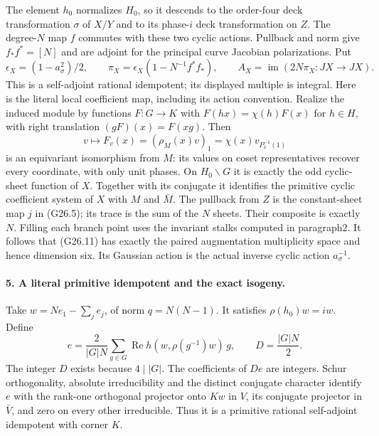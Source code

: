 The element \(h_0\) normalizes \(H_0\), so it descends
to the order-four deck transformation \(\sigma\) of \(X/Y\)
and to its phase-\(i\) deck transformation on \(Z\).
The degree-\(N\) map \(f\) commutes with these two cyclic
actions. Pullback and norm give \(f_*f^*=[N]\) and are
adjoint for the principal curve Jacobian polarizations.
Put
\[
 \epsilon_X=(1-a_\sigma^2)/2,\qquad
 \pi_X=\epsilon_X(1-N^{-1}f^*f_*),\qquad
 A_X=\operatorname{im}(2N\pi_X:JX\to JX).
                                                               \tag{G26.11}
\]
This is a self-adjoint rational idempotent; its displayed
multiple is integral. Here is the literal local coefficient
map, including its action convention. Realize the induced
module by functions \(F:G\to K\) with
\(F(hx)=\chi(h)F(x)\) for \(h\in H\), with right
translation \((gF)(x)=F(xg)\). Then
\[
 v\longmapsto F_v(x)=(\rho_M(x)v)_1
             =\chi(x)v_{P_x^{-1}(1)}
                                                               \tag{G26.11a}
\]
is an equivariant isomorphism from \(M\): its values on
coset representatives recover every coordinate, with only
unit phases. On \(H_0\backslash G\) it is exactly the
odd cyclic-sheet function of \(X\). Together with its
conjugate it identifies the primitive cyclic coefficient
system of \(X\) with \(M\) and \(\bar M\).
The pullback from \(Z\) is the constant-sheet
map \(j\) in (G26.5); its trace is the sum of the \(N\)
sheets. Their composite is exactly \(N\). Filling each
branch point uses the invariant stalks computed in paragraph2.
It follows that (G26.11) has exactly the paired augmentation
multiplicity space and hence dimension six. Its Gaussian
action is the actual inverse cyclic action \(a_\sigma^{-1}\).

\paragraph{5. A literal primitive idempotent and the exact isogeny.}
Take \(w=Ne_1-\sum_je_j\), of norm
\(q=N(N-1)\). It satisfies \(\rho(h_0)w=iw\).
Define
\[
 e=\frac{2}{|G|N}\sum_{g\in G}
       \operatorname{Re}h(w,\rho(g^{-1})w)\,g,\qquad
 D=\frac{|G|N}{2}.                                      \tag{G26.12}
\]
The integer \(D\) exists because \(4\mid |G|\).
The coefficients of \(De\) are integers. Schur
orthogonality, absolute irreducibility and the distinct
conjugate character identify \(e\) with the rank-one
orthogonal projector onto \(Kw\) in \(V\), its conjugate
projector in \(\bar V\), and zero on every other
irreducible. Thus it is a primitive rational self-adjoint
idempotent with corner \(K\).

